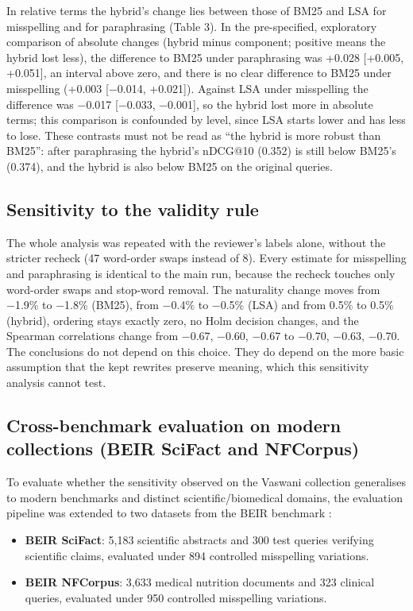 \documentclass[
  11pt,
]{article}
\begin{document}
In relative terms the hybrid's change lies between those of BM25 and LSA
for misspelling and for paraphrasing (Table 3). In the pre-specified,
exploratory comparison of absolute changes (hybrid minus component;
positive means the hybrid lost less), the difference to BM25 under
paraphrasing was +0.028 {[}+0.005, +0.051{]}, an interval above zero,
and there is no clear difference to BM25 under misspelling (+0.003
{[}−0.014, +0.021{]}). Against LSA under misspelling the difference was
−0.017 {[}−0.033, −0.001{]}, so the hybrid lost more in absolute terms;
this comparison is confounded by level, since LSA starts lower and has
less to lose. These contrasts must not be read as ``the hybrid is more
robust than BM25'': after paraphrasing the hybrid's nDCG@10 (0.352) is
still below BM25's (0.374), and the hybrid is also below BM25 on the
original queries.

\hypertarget{sensitivity-to-the-validity-rule}{%
\subsection{Sensitivity to the validity
rule}\label{sensitivity-to-the-validity-rule}}

The whole analysis was repeated with the reviewer's labels alone,
without the stricter recheck (47 word-order swaps instead of 8). Every
estimate for misspelling and paraphrasing is identical to the main run,
because the recheck touches only word-order swaps and stop-word removal.
The naturality change moves from −1.9\% to −1.8\% (BM25), from −0.4\% to
−0.5\% (LSA) and from 0.5\% to 0.5\% (hybrid), ordering stays exactly
zero, no Holm decision changes, and the Spearman correlations change
from −0.67, −0.60, −0.67 to −0.70, −0.63, −0.70. The conclusions do not
depend on this choice. They do depend on the more basic assumption that
the kept rewrites preserve meaning, which this sensitivity analysis
cannot test.

\hypertarget{cross-benchmark-evaluation-on-beir}{%
\subsection{Cross-benchmark evaluation on modern collections (BEIR SciFact and NFCorpus)}\label{cross-benchmark-evaluation-on-beir}}

To evaluate whether the sensitivity observed on the Vaswani collection generalises to modern benchmarks and distinct scientific/biomedical domains, the evaluation pipeline was extended to two datasets from the BEIR benchmark \citep{thakur2021}:
\begin{itemize}
  \item \textbf{BEIR SciFact}: 5,183 scientific abstracts and 300 test queries verifying scientific claims, evaluated under 894 controlled misspelling variations.
  \item \textbf{BEIR NFCorpus}: 3,633 medical nutrition documents and 323 clinical queries, evaluated under 950 controlled misspelling variations.
\end{itemize}
\end{document}
